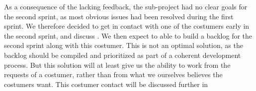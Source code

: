 As a consequence of the lacking feedback, the \launcher sub-project had no clear goals for the second sprint, as most obvious issues had been resolved during the first sprint.
We therefore decided to get in contact with one of the costumers early in the second sprint, and discuss \launcher.
We then expect to able to build a backlog for the second sprint along with this costumer.
This is not an optimal solution, as the backlog should be compiled and prioritized as part of a coherent development process.
But this solution will at least give us the ability to work from the requests of a costumer, rather than from what we ourselves believes the costumers want.
This costumer contact will be discussed further in 